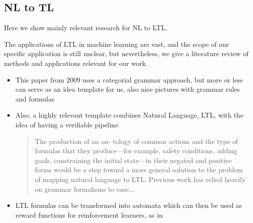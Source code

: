 \documentclass[a4paper, 11pt]{article}
\begin{document}
\subsection{NL to TL}

Here we show mainly relevant research for NL to LTL.

The applications of LTL in machine learning are vast, and the scope of our
specific application is still unclear, but nevertheless, we give a literature
review of methods and applications relevant for our work.

\begin{itemize}



\item This paper \cite{5152776} from 2009 uses a categorial grammar approach, but more or less
  can serve as an idea template for us, also nice pictures with grammar rules
  and formulas
\item Also, a highly relevant template combines Natural Language, LTL, with the
  idea of having a verifiable pipeline \cite{provCorrectNatControl} 

\begin{quote}
The production of an on-
tology of common actions and the type of formulas that
they produce—for example, safety conditions, adding goals,
constraining the initial state—in their negated and positive
forms would be a step toward a more general solution to
the problem of mapping natural language to LTL. Previous
work has relied heavily on grammar formalisms to ease...
\cite{provCorrectNatControl} 
\end{quote}

\item LTL formulas can be transformed into automata which can then be used as reward functions for reinforcement learners, as in \cite{ltlRein}


\end{itemize}
\end{document}
